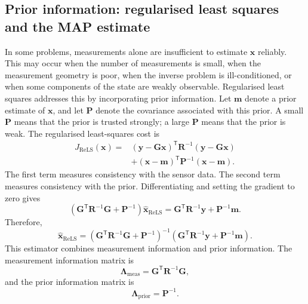 \subsection{Prior information: regularised least squares and the MAP estimate}
In some problems, measurements alone are insufficient to estimate $\mathbf{x}$ reliably. This may occur when the number of measurements is small, when the measurement geometry is poor, when the inverse problem is ill-conditioned, or when some components of the state are weakly observable. Regularised least squares addresses this by incorporating prior information. Let $\mathbf{m}$ denote a prior estimate of $\mathbf{x}$, and let $\mathbf{P}$ denote the covariance associated with this prior. A small $\mathbf{P}$ means that the prior is trusted strongly; a large $\mathbf{P}$ means that the prior is weak. The regularised least-squares cost is
\begin{align}
J_{\mathrm{ReLS}}(\mathbf{x})
=&
\left(
\mathbf{y}
-
\mathbf{G}\mathbf{x}
\right)^{\mathsf T}
\mathbf{R}^{-1}
\left(
\mathbf{y}
-
\mathbf{G}\mathbf{x}
\right) \nonumber \\
&+
\left(
\mathbf{x}
-
\mathbf{m}
\right)^{\mathsf T}
\mathbf{P}^{-1}
\left(
\mathbf{x}
-
\mathbf{m}
\right).
\end{align}
The first term measures consistency with the sensor data. The second term measures consistency with the prior. Differentiating and setting the gradient to zero gives
\begin{equation}
\left(
\mathbf{G}^{\mathsf T}
\mathbf{R}^{-1}
\mathbf{G}
+
\mathbf{P}^{-1}
\right)
\widehat{\mathbf{x}}_{\mathrm{ReLS}}
=
\mathbf{G}^{\mathsf T}
\mathbf{R}^{-1}
\mathbf{y}
+
\mathbf{P}^{-1}
\mathbf{m}.
\end{equation}
Therefore,
\begin{equation}
\widehat{\mathbf{x}}_{\mathrm{ReLS}}
=
\left(
\mathbf{G}^{\mathsf T}
\mathbf{R}^{-1}
\mathbf{G}
+
\mathbf{P}^{-1}
\right)^{-1}
\left(
\mathbf{G}^{\mathsf T}
\mathbf{R}^{-1}
\mathbf{y}
+
\mathbf{P}^{-1}
\mathbf{m}
\right).
\end{equation}
This estimator combines measurement information and prior information. The measurement information matrix is
\begin{equation}
\mathbf{\Lambda}_{\mathrm{meas}}
=
\mathbf{G}^{\mathsf T}
\mathbf{R}^{-1}
\mathbf{G},
\end{equation}
and the prior information matrix is
\begin{equation}
\mathbf{\Lambda}_{\mathrm{prior}}
=
\mathbf{P}^{-1}.
\end{equation}
